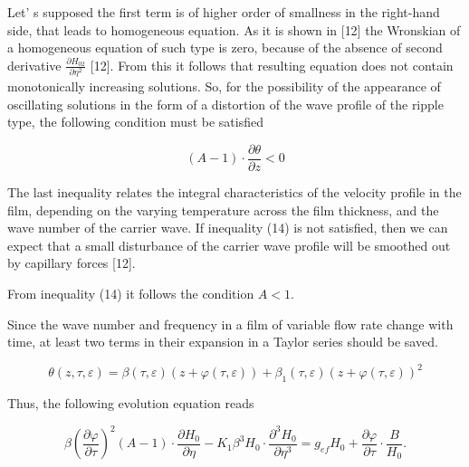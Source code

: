 \begin{multicols}{2}
Let' s supposed the first term is of higher order of smallness in the
right-hand side, that leads to homogeneous equation. As it is shown in
{[}12{]} the Wronskian of a homogeneous equation of such type is zero,
because of the absence of second derivative $\frac{\partial
H_{02}}{\partial \eta^2}$ {[}12{]}. From this it follows that
resulting equation does not contain monotonically increasing
solutions. So, for the possibility of the appearance of oscillating
solutions in the form of a distortion of the wave profile of the
ripple type, the following condition must be satisfied

\begin{equation}
(A - 1) \cdot \frac{\partial \theta}{\partial z} < 0
\end{equation}

The last inequality relates the integral characteristics of the
velocity profile in the film, depending on the varying temperature
across the film thickness, and the wave number of the carrier wave. If
inequality (14) is not satisfied, then we can expect that a small
disturbance of the carrier wave profile will be smoothed out by
capillary forces {[}12{]}.

From inequality (14) it follows the condition $A<1$.

Since the wave number and frequency in a film of variable flow rate
change with time, at least two terms in their expansion in a Taylor
series should be saved.
\end{multicols}

\begin{equation}
\theta(z, \tau, \varepsilon) = \beta(\tau, \varepsilon) \left(z + \varphi(\tau, \varepsilon)\right)
+ \beta_1(\tau, \varepsilon) \left(z + \varphi(\tau, \varepsilon)\right)^2
\end{equation}

Thus, the following evolution equation reads

\begin{equation}
\beta \left( \frac{\partial \varphi}{\partial \tau} \right)^2 (A - 1) \cdot \frac{\partial H_0}{\partial \eta}
- K_1 \beta^3 H_0 \cdot \frac{\partial^3 H_0}{\partial \eta^3}
= g_{\mathit{ef}} H_0 + \frac{\partial \varphi}{\partial \tau} \cdot \frac{B}{H_0}.
\end{equation}

